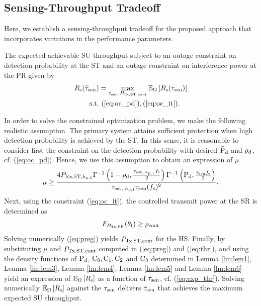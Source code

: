 \subsection{Sensing-Throughput Tradeoff}
Here, we establish a sensing-throughput tradeoff for the proposed approach that incorporates variations in the performance parameters. 
\begin{theorem} \label{th:th1}
\normalfont
The expected achievable SU throughput subject to an outage constraint on detection probability at the ST and an outage constraint on interference power at the PR given by
\begin{align}
\rs(\ttsen) &= \maxi_{\tsen, \preg} \e{\Omega}{\rs(\tsen)} \label{eq:opT_em}\\
\text{s.t.} & \text{ } (\ref{eq:oc_pd}), (\ref{eq:oc_it}). \nonumber 
\end{align}
\end{theorem}
\begin{IEEEproof}
In order to solve the constrained optimization problem, we make the following realistic assumption. The primary system attains sufficient protection when high detection probability is achieved by the ST. In this sense, it is reasonable to consider first the constraint on the detection probability with desired $\bar{\text{P}}_{\text{d}}$ and $\rho_{\text{d}}$, cf. (\ref{eq:oc_pd}). Hence, we use this assumption to obtain an expression of $\mu$ \cite{Kaushik16}
\begin{align}
\mu \ge \frac{4 \prcvdstpt \Gamma^{-1} \left(1 - \opdc, \frac{\testpt \fsam}{2}\right) \Gamma^{-1} \left(\pdd, \frac{\tsen \fsam}{2}\right)}{ \testpt \tsen (\fsam)^2  }. 
\label{eq:thr}
\end{align}
Next, using the constraint (\ref{eq:oc_it}), the controlled transmit power at the SR is determined as  
\begin{align}
\fprcvdpr(\ite) \ge \opc %
\label{eq:preg}
\end{align}
Solving numerically (\ref{eq:preg}) yields $P_{\text{Tx,ST,cont}}$ for the HS.
Finally, by substituting $\mu$ and $P_{\text{Tx,ST,cont}}$ computed in (\ref{eq:preg}) and (\ref{eq:thr}), and using the density functions of $\text{P}_{\text{d}}$, $\text{C}_0, \text{C}_1, \text{C}_2$ and $\text{C}_3$ determined in Lemma \ref{lm:lem1}, Lemma \ref{lm:lem3}, Lemma \ref{lm:lem4}, Lemma \ref{lm:lem5} and Lemma \ref{lm:lem6} yield an expression of ${\mathbb E}_{\Omega}\left[ R_{\text{s}} \right]$ as a function of $\tau_{\text{sen}}$, cf. (\ref{eq:exp_thr}). Solving numerically ${\mathbb E}_{\Omega}\left[ R_{\text{s}} \right]$ against the $\tau_{\text{sen}}$ delivers $\tilde{\tau}_{\text{sen}}$ that achieves the maximum expected SU throughput.  
\end{IEEEproof}
